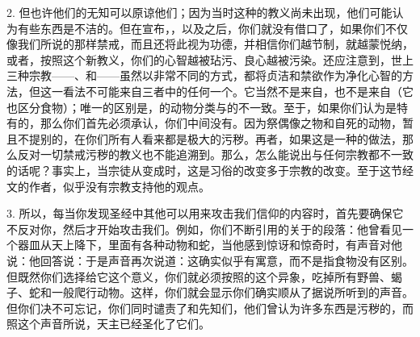 2. 但也许他们的无知可以原谅他们；因为当时这种的教义尚未出现，他们可能认为有些东西是不洁的。但在宣布，，以及之后，你们就没有借口了，如果你们不仅像我们所说的那样禁戒，而且还将此视为功德，并相信你们越节制，就越蒙悦纳，或者，按照这个新教义，你们的心智越被玷污、良心越被污染。还应注意到，世上三种宗教——、和——虽然以非常不同的方式，都将贞洁和禁欲作为净化心智的方法，但这一看法不可能来自三者中的任何一个。它当然不是来自，也不是来自（它也区分食物）；唯一的区别是，的动物分类与的不一致。至于，如果你们认为是特有的，那么你们首先必须承认，你们中间没有。因为祭偶像之物和自死的动物，暂且不提别的，在你们所有人看来都是极大的污秽。再者，如果这是一种的做法，那么反对一切禁戒污秽的教义也不能追溯到。那么，怎么能说出与任何宗教都不一致的话呢？事实上，当宗徒从变成时，这是习俗的改变多于宗教的改变。至于这节经文的作者，似乎没有宗教支持他的观点。\par

3. 所以，每当你发现圣经中其他可以用来攻击我们信仰的内容时，首先要确保它不反对你，然后才开始攻击我们。例如，你们不断引用的关于的段落：他曾看见一个器皿从天上降下，里面有各种动物和蛇，当他感到惊讶和惊奇时，有声音对他说：他回答说：于是声音再次说道：这确实似乎有寓意，而不是指食物没有区别。但既然你们选择给它这个意义，你们就必须按照的这个异象，吃掉所有野兽、蝎子、蛇和一般爬行动物。这样，你们就会显示你们确实顺从了据说所听到的声音。但你们决不可忘记，你们同时谴责了和先知们，他们曾认为许多东西是污秽的，而照这个声音所说，天主已经圣化了它们。\par


